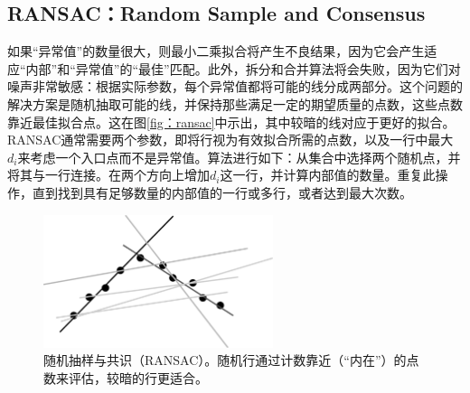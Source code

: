 
\subsection{RANSAC：Random Sample and Consensus}
如果“异常值”的数量很大，则最小二乘拟合将产生不良结果，因为它会产生适应“内部”和“异常值”的“最佳”匹配。此外，拆分和合并算法将会失败，因为它们对噪声非常敏感：根据实际参数，每个异常值都将可能的线分成两部分。这个问题的解决方案是随机抽取可能的线，并保持那些满足一定的期望质量的点数，这些点数靠近最佳拟合点。这在图\ref{fig：ransac}中示出，其中较暗的线对应于更好的拟合。RANSAC通常需要两个参数，即将行视为有效拟合所需的点数，以及一行中最大$d_i$来考虑一个入口点而不是异常值。算法进行如下：从集合中选择两个随机点，并将其与一行连接。在两个方向上增加$d_i$这一行，并计算内部值的数量。重复此操作，直到找到具有足够数量的内部值的一行或多行，或者达到最大次数。


\begin{figure}
\center
\includegraphics[width=0.6\textwidth]{figs/ransac}
\caption{
随机抽样与共识（RANSAC）。随机行通过计数靠近（“内在”）的点数来评估，较暗的行更适合。
\label{fig:ransac}} 
\end{figure}

